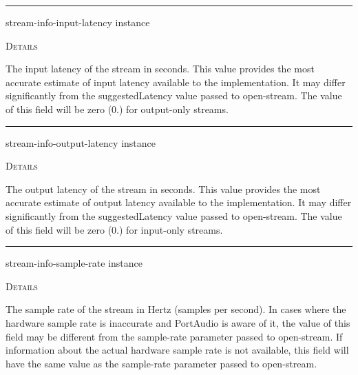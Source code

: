 \documentclass[a4paper]{report}
\begin{document}
  

    \rule{\linewidth}{0.1mm}
    
    \label{portaudio__fun__stream-info-input-latency}
    \begin{defun}[Function]
    stream-info-input-latency instance


	
    \bigskip
    \textsc{Details}

The input latency of the stream in seconds. This value provides the most accurate estimate of input latency available to the implementation. It may differ significantly from the suggestedLatency value passed to open-stream. The value of this field will be zero (0.) for output-only streams.


    
    \end{defun}
  
  

    \rule{\linewidth}{0.1mm}
    
    \label{portaudio__fun__stream-info-output-latency}
    \begin{defun}[Function]
    stream-info-output-latency instance


	
    \bigskip
    \textsc{Details}

The output latency of the stream in seconds. This value provides the most accurate estimate of output latency available to the implementation. It may differ significantly from the suggestedLatency value passed to open-stream. The value of this field will be zero (0.) for input-only streams.


    
    \end{defun}
  
  

    \rule{\linewidth}{0.1mm}
    
    \label{portaudio__fun__stream-info-sample-rate}
    \begin{defun}[Function]
    stream-info-sample-rate instance


	
    \bigskip
    \textsc{Details}

The sample rate of the stream in Hertz (samples per second). In cases where the hardware sample rate is inaccurate and PortAudio is aware of it, the value of this field may be different from the sample-rate parameter passed to open-stream. If information about the actual hardware sample rate is not available, this field will have the same value as the sample-rate parameter passed to open-stream.


    
    \end{defun}
  
\end{document}
